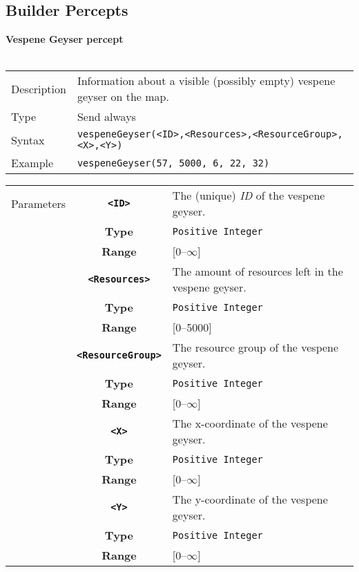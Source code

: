 \subsection{Builder Percepts}
\textbf{Vespene Geyser percept}\\
\\
\begin{tabularx}{\textwidth}{lX}
 Description & Information about a visible (possibly empty) vespene geyser on the map. \\
 Type & Send always \\
 Syntax & \verb|vespeneGeyser(<ID>,<Resources>,<ResourceGroup>,<X>,<Y>)| \\
 Example & \verb|vespeneGeyser(57, 5000, 6, 22, 32)| \\
 \end{tabularx}
 \begin{tabularx}{\textwidth}{l | c | p{8cm}|}
 \cline{2-3}
 Parameters & \textbf{\verb|<ID>|} & The (unique) \textit{ID} of the vespene geyser.\\
            & \textbf{Type} & \verb|Positive Integer| \\
            & \textbf{Range} & [0--$\infty$] \\
            \cline{2-3}
            & \textbf{\verb|<Resources>|} & The amount of resources left in the vespene geyser.\\
            & \textbf{Type} & \verb|Positive Integer| \\
            & \textbf{Range} & [0--5000] \\
            \cline{2-3}
            & \textbf{\verb|<ResourceGroup>|} & The resource group of the vespene geyser. \\
            & \textbf{Type} & \verb|Positive Integer| \\
            & \textbf{Range} & [0--$\infty$] \\
            \cline{2-3}
            & \textbf{\verb|<X>|} & The x-coordinate of the vespene geyser.\\
            & \textbf{Type} & \verb|Positive Integer| \\
            & \textbf{Range} & [0--$\infty$] \\
            \cline{2-3}
            & \textbf{\verb|<Y>|} & The y-coordinate of the vespene geyser.\\
            & \textbf{Type} & \verb|Positive Integer| \\
            & \textbf{Range} & [0--$\infty$] \\
            \cline{2-3}
\end{tabularx} \\
